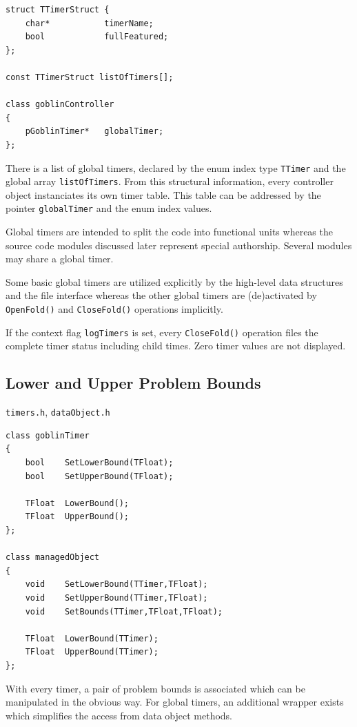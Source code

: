 \documentclass[a4paper,11pt,twoside]{book}
\begin{document}
\begin{multicols}{2}
\begin{mymethods}
\begin{verbatim}
struct TTimerStruct {
    char*           timerName;
    bool            fullFeatured;
};

const TTimerStruct listOfTimers[];

class goblinController
{
    pGoblinTimer*   globalTimer;
};
\end{verbatim}
\end{mymethods}
There is a list of global timers, declared by the enum index type \verb/TTimer/
and the global array \verb/listOfTimers/. From this structural information,
every controller object instanciates its own timer table. This table can be
addressed by the pointer \verb/globalTimer/ and the enum index values.

Global timers are intended to split the code into functional units whereas the
source code modules discussed later represent special authorship. Several
modules may share a global timer.

Some basic global timers are utilized explicitly by the high-level data
structures and the file interface whereas the other global timers are
(de)activated by \verb/OpenFold()/ and \verb/CloseFold()/ operations implicitly.

If the context flag \verb/logTimers/ is set, every \verb/CloseFold()/ operation
files the complete timer status including child times. Zero timer values are
not displayed.



\subsection{Lower and Upper Problem Bounds}
\label{slb_bounds}
\myincludes\verb/timers.h/, \verb/dataObject.h/
\begin{mymethods}
\begin{verbatim}
class goblinTimer
{
    bool    SetLowerBound(TFloat);
    bool    SetUpperBound(TFloat);
    
    TFloat  LowerBound();
    TFloat  UpperBound();
};

class managedObject
{
    void    SetLowerBound(TTimer,TFloat);
    void    SetUpperBound(TTimer,TFloat);
    void    SetBounds(TTimer,TFloat,TFloat);

    TFloat  LowerBound(TTimer);
    TFloat  UpperBound(TTimer);
};
\end{verbatim}
\end{mymethods}
With every timer, a pair of problem bounds is associated which can be
manipulated in the obvious way. For global timers, an additional wrapper
exists which simplifies the access from data object methods.


\end{multicols}
\end{document}
